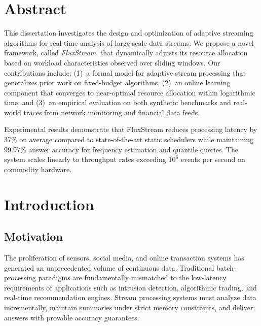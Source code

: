 \documentclass[
    language=english,
    doctype=dissertation,
    institution=none,
    titlestyle=book,
]{../../omnilatex}
\begin{document}
\maketitle

\frontmatter
\chapter{Abstract}

This dissertation investigates the design and optimization of adaptive streaming algorithms for real-time analysis of large-scale data streams. We propose a novel framework, called \emph{FluxStream}, that dynamically adjusts its resource allocation based on workload characteristics observed over sliding windows. Our contributions include: (1)~a formal model for adaptive stream processing that generalizes prior work on fixed-budget algorithms, (2)~an online learning component that converges to near-optimal resource allocation within logarithmic time, and (3)~an empirical evaluation on both synthetic benchmarks and real-world traces from network monitoring and financial data feeds.

Experimental results demonstrate that FluxStream reduces processing latency by 37\% on average compared to state-of-the-art static schedulers while maintaining 99.97\% answer accuracy for frequency estimation and quantile queries. The system scales linearly to throughput rates exceeding $10^6$ events per second on commodity hardware.

\tableofcontents
\listoffigures
\listoftables

\mainmatter

\chapter{Introduction}\label{ch:intro}

\section{Motivation}

The proliferation of sensors, social media, and online transaction systems has generated an unprecedented volume of continuous data. Traditional batch-processing paradigms are fundamentally mismatched to the low-latency requirements of applications such as intrusion detection, algorithmic trading, and real-time recommendation engines. Stream processing systems must analyze data incrementally, maintain summaries under strict memory constraints, and deliver answers with provable accuracy guarantees.
\end{document}
